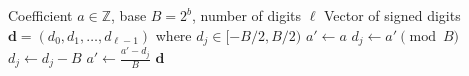 \begin{algorithm}
\caption{Signed LSB Base-$B$ Decomposition}
\label{alg:lsb-decomp}
\begin{algorithmic}[1]
\Require Coefficient $a \in \mathbb{Z}$, base $B = 2^b$, number of digits $\ell$
\Ensure Vector of signed digits $\mathbf{d} = (d_0, d_1, \dots, d_{\ell-1})$ where $d_j \in [-B/2, B/2)$
\State $a' \gets a$
    \State $d_j \gets a' \pmod B$ 
        \State $d_j \gets d_j - B$ 
    \EndIf
    \State $a' \gets \frac{a' - d_j}{B}$ 
\EndFor
\State \Return $\mathbf{d}$
\end{algorithmic}
\end{algorithm}

    
        
